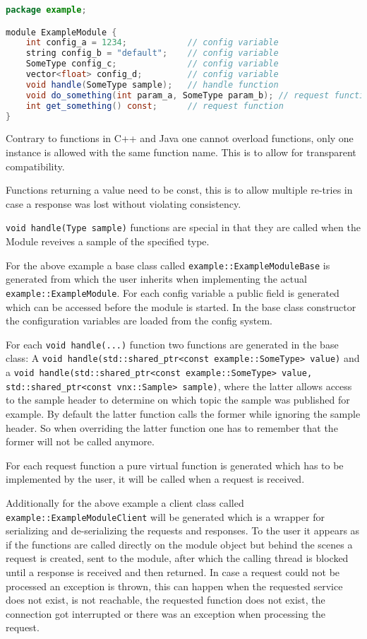 \documentclass[10pt,a4paper]{report}
\begin{document}
\begin{lstlisting}[language=Java, caption=ExampleModule.vni]
package example;

module ExampleModule {
	int config_a = 1234;			// config variable
	string config_b = "default";	// config variable
	SomeType config_c;				// config variable
	vector<float> config_d;			// config variable
	void handle(SomeType sample);	// handle function
	void do_something(int param_a, SomeType param_b); // request function
	int get_something() const;		// request function
}
\end{lstlisting}

Contrary to functions in C++ and Java one cannot overload functions, only one instance is allowed with the same function name. This is to allow for transparent compatibility.

Functions returning a value need to be const, this is to allow multiple re-tries in case a response was lost without violating consistency.

\lstinline|void handle(Type sample)| functions are special in that they are called when the Module reveives a sample of the specified type.

For the above example a base class called \lstinline|example::ExampleModuleBase| is generated from which the user inherits when implementing the actual \lstinline|example::ExampleModule|. For each config variable a public field is generated which can be accessed before the module is started. In the base class constructor the configuration variables are loaded from the config system.

For each \lstinline|void handle(...)| function two functions are generated in the base class: A \lstinline|void handle(std::shared_ptr<const example::SomeType> value)| and a \lstinline|void handle(std::shared_ptr<const example::SomeType> value, std::shared_ptr<const vnx::Sample> sample)|, where the latter allows access to the sample header to determine on which topic the sample was published for example. By default the latter function calls the former while ignoring the sample header. So when overriding the latter function one has to remember that the former will not be called anymore.

For each request function a pure virtual function is generated which has to be implemented by the user, it will be called when a request is received.

Additionally for the above example a client class called \lstinline|example::ExampleModuleClient| will be generated which is a wrapper for serializing and de-serializing the requests and responses. To the user it appears as if the functions are called directly on the module object but behind the scenes a request is created, sent to the module, after which the calling thread is blocked until a response is received and then returned. In case a request could not be processed an exception is thrown, this can happen when the requested service does not exist, is not reachable, the requested function does not exist, the connection got interrupted or there was an exception when processing the request.
\end{document}
